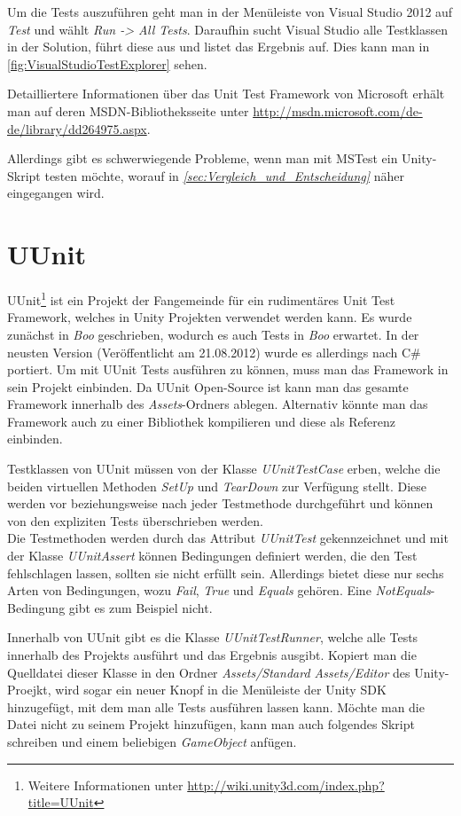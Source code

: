 Um die Tests auszuführen geht man in der Menüleiste von Visual Studio 2012 auf \textit{Test} und wählt \textit{Run -> All Tests}. Daraufhin sucht Visual Studio alle Testklassen in der Solution, führt diese aus und listet das Ergebnis auf. Dies kann man in \autoref{fig:VisualStudioTestExplorer} sehen.

Detailliertere Informationen über das Unit Test Framework von Microsoft erhält man auf deren MSDN-Bibliotheksseite unter \url{http://msdn.microsoft.com/de-de/library/dd264975.aspx}.

Allerdings gibt es schwerwiegende Probleme, wenn man mit MSTest ein Unity-Skript testen möchte, worauf in \textit{\autoref{sec:Vergleich_und_Entscheidung} } näher eingegangen wird.

\section{UUnit}

UUnit\footnote{Weitere Informationen unter \url{http://wiki.unity3d.com/index.php?title=UUnit}} ist ein Projekt der Fangemeinde für ein rudimentäres Unit Test Framework, welches in Unity Projekten verwendet werden kann. Es wurde zunächst in \textit{Boo} geschrieben, wodurch es auch Tests in \textit{Boo} erwartet. In der neusten Version (Veröffentlicht am 21.08.2012) wurde es allerdings nach C\# portiert.
Um mit UUnit Tests ausführen zu können, muss man das Framework in sein Projekt einbinden. Da UUnit Open-Source ist kann man das gesamte Framework innerhalb des \textit{Assets}-Ordners ablegen. Alternativ könnte man das Framework auch zu einer Bibliothek kompilieren und diese als Referenz einbinden.

Testklassen von UUnit müssen von der Klasse \textit{UUnitTestCase} erben, welche die beiden virtuellen Methoden \textit{SetUp} und \textit{TearDown} zur Verfügung stellt. Diese werden vor beziehungsweise nach jeder Testmethode durchgeführt und können von den expliziten Tests überschrieben werden.\\
Die Testmethoden werden durch das Attribut \textit{UUnitTest} gekennzeichnet und mit der Klasse \textit{UUnitAssert} können Bedingungen definiert werden, die den Test fehlschlagen lassen, sollten sie nicht erfüllt sein. Allerdings bietet diese nur sechs Arten von Bedingungen, wozu \textit{Fail}, \textit{True} und \textit{Equals} gehören. Eine \textit{NotEquals}-Bedingung gibt es zum Beispiel nicht.

Innerhalb von UUnit gibt es die Klasse \textit{UUnitTestRunner}, welche alle Tests innerhalb des Projekts ausführt und das Ergebnis ausgibt. Kopiert man die Quelldatei dieser Klasse in den Ordner \textit{Assets/Standard Assets/Editor} des Unity-Proejkt, wird sogar ein neuer Knopf in die Menüleiste der Unity SDK hinzugefügt, mit dem man alle Tests ausführen lassen kann. Möchte man die Datei nicht zu seinem Projekt hinzufügen, kann man auch folgendes Skript schreiben und einem beliebigen \textit{GameObject} anfügen.
\pagebreak


